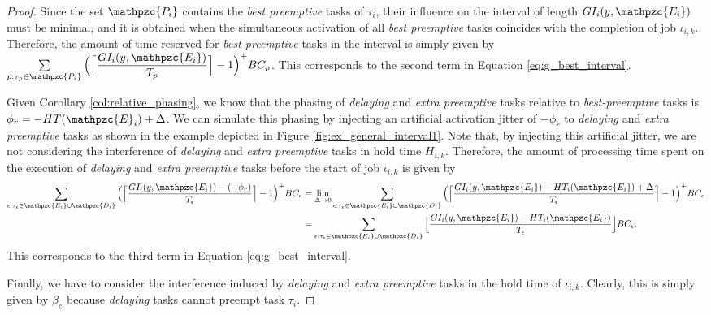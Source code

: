 \documentclass[fleqn]{article}
\begin{document}
\begin{proof}
	Since the set  $\mathpzc{P_i}$ contains the \textit{best preemptive} tasks of $\tau_i$, their influence on the interval of length $GI_i(y,  \mathpzc{E_i})$ must be minimal, and it is obtained when the simultaneous activation of all \textit{best preemptive} tasks coincides with the completion of job $\iota_{i,k}$. Therefore, the amount of time reserved for \textit{best preemptive} tasks in the interval is simply given by $\sum\limits_{p:\tau_p \in \mathpzc{P_i}} \Big( \Big\lceil  \dfrac{GI_i(y,  \mathpzc{E_i})}{T_p}\Big\rceil -1 \Big)^+  BC_p $. This corresponds to the second term in Equation \ref{eq:g_best_interval}.
	
	Given Corollary \ref{col:relative_phasing}, we know that the phasing of \textit{delaying} and \textit{extra preemptive} tasks relative to \textit{best-preemptive} tasks is $\phi_r = -HT(\mathpzc{E}_i)+\Delta$. We can simulate this phasing by injecting an artificial activation jitter of $-\phi_r$ to \textit{delaying} and \textit{extra preemptive} tasks as shown in the example depicted in Figure \ref{fig:ex_general_interval1}. Note that, by injecting this artificial jitter, we are not considering the interference of \textit{delaying} and \textit{extra preemptive} tasks in hold time $H_{i,k}$. Therefore, the amount of processing time spent on the execution of \textit{delaying} and \textit{extra preemptive} tasks before the start of job $\iota_{i,k}$ is given by
	\begin{align*}
		\sum\limits_{\epsilon:\tau_{\epsilon} \in \mathpzc{E_i} \cup \mathpzc{D_i}} \Big( \Big\lceil  \dfrac{GI_i(y,  \mathpzc{E_i})-(-\phi_r)}{T_\epsilon}\Big\rceil -1 \Big)^+  BC_\epsilon &=
		\lim \limits_{\Delta \rightarrow 0} \sum\limits_{\epsilon:\tau_{\epsilon} \in \mathpzc{E_i} \cup \mathpzc{D_i}} \Big( \Big\lceil  \dfrac{GI_i(y,  \mathpzc{E_i})-HT_i(\mathpzc{E_i})+\Delta}{T_\epsilon}\Big\rceil -1 \Big)^+  BC_\epsilon \\
		& = \sum\limits_{\epsilon:\tau_{\epsilon} \in \mathpzc{E_i} \cup \mathpzc{D_i}} \Big\lfloor  \dfrac{GI_i(y,  \mathpzc{E_i})-HT_i(\mathpzc{E_i})}{T_\epsilon}\Big\rfloor  BC_\epsilon.
	\end{align*}
	This corresponds to the third term in Equation \ref{eq:g_best_interval}.
	
	Finally, we have to consider the interference induced by \textit{delaying} and \textit{extra preemptive} tasks in the hold time of $\iota_{i,k}$. Clearly, this is simply given by $\beta_e$ because \textit{delaying} tasks cannot preempt task $\tau_i$.
\end{proof}
\end{document}
